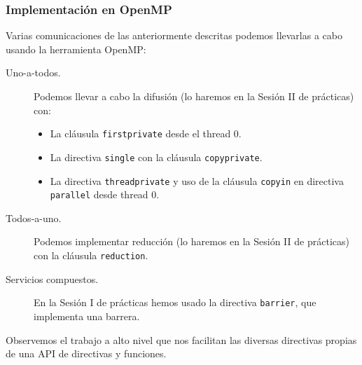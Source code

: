 
\subsubsection{Implementación en OpenMP} 
Varias comunicaciones de las anteriormente descritas podemos llevarlas a cabo usando la herramienta OpenMP:
\begin{description}
    \item [Uno-a-todos.] Podemos llevar a cabo la difusión (lo haremos en la Sesión II de prácticas) con:
        \begin{itemize}
            \item La cláusula \verb|firstprivate| desde el thread 0.
            \item La directiva \verb|single| con la cláusula \verb|copyprivate|. 
            \item La directiva \verb|threadprivate| y uso de la cláusula \verb|copyin| en directiva \verb|parallel| desde thread 0.
        \end{itemize}
    \item [Todos-a-uno.] Podemos implementar reducción (lo haremos en la Sesión II de prácticas) con la cláusula \verb|reduction|. 
    \item [Servicios compuestos.] En la Sesión I de prácticas hemos usado la directiva \verb|barrier|, que implementa una barrera.
\end{description}
Observemos el trabajo a alto nivel que nos facilitan las diversas directivas propias de una API de directivas y funciones.


